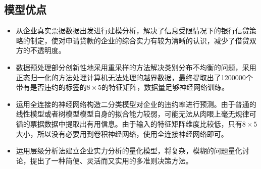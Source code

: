 \documentclass{cumcmthesis}
\begin{document}
\subsection{模型优点}
\begin{itemize}
    \item 从企业真实票据数据出发进行建模分析，解决了信息受限情况下的银行信贷策略的制定，使对申请贷款的企业的综合实力有较为清晰的认识，减少了借贷双方的不透明度。
    \item 数据预处理部分创新性地采用重采样的方法解决类别分布不均衡的问题，采用正态归一化的方法处理计算机无法处理的越界数据，最终提取出了1200000个带有是否违约的标签的$8 \times 5$的特征矩阵，数据量足够神经网络训练。
    \item 运用全连接的神经网络构造二分类模型对企业的违约率进行预测。由于普通的线性模型或者树模型模型自身的拟合能力较弱，可能无法从肉眼上毫无规律可循的票据数据中提取出有用信息。由于输入的特征矩阵维度比较低，只有$8 \times 5$大小，所以没有必要用到卷积神经网络，使用全连接神经网络即可。
    \item 运用层级分析法建立企业实力分析的量化模型，将复杂，模糊的问题量化讨论，提出了一种简便、灵活而又实用的多准则决策方法。
\end{itemize}
\end{document}
